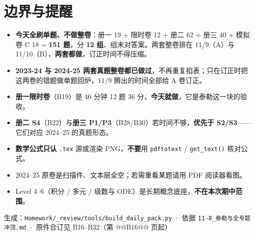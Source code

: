 \section{边界与提醒}
\begin{itemize}
\item \textbf{今天全刷单题、不做整卷}：册一 19 + 限时卷 12 + 册二 62 + 册三 40 + 模拟卷 C 18 = \textbf{151 题}，分 \textbf{12 组}、组末对答案。两套整卷排在 11/9（A）与 11/10（B），\textbf{两套都做}，订正时间不得压缩。
\item \textbf{2023-24 与 2024-25 两套真题整卷都已做过}，不再重复掐表；只在订正时把这两卷的错题做单题回炉，11/9 腾出的时间全部给 A 卷订正。
\item \textbf{册一限时卷}（B19）是 40 分钟 12 题 36 分，\textbf{今天就做}，它是泰勒这一块的验收。
\item \textbf{册二 S4}（B22）与\textbf{册三 P1/P3}（B28/B30）若时间不够，\textbf{优先于 S2/S3}——它们对应 2024--25 的真题形态。
\item \textbf{数学公式只认} \texttt{.tex} 源或渲染 PNG，\textbf{不要}用 \texttt{pdftotext} / \texttt{get\_text()} 核对公式。
\item 2024--25 原卷是扫描件、文本层全空；若需重看某题请用 PDF 阅读器看图。
\item Level 4--6（积分 / 多元 / 级数与 ODE）是长期概念底座，\textbf{不在本次期中范围}。
\end{itemize}

\vfill
\begin{center}
{\small\color{gray} 生成：\texttt{Homework/\_review/tools/build\_daily\_pack.py} ·
依据 \texttt{11-8\_泰勒与全专题冲顶.md} ·
原件合订见 B16--B32（第 @@B16@@ 页起）}
\end{center}

